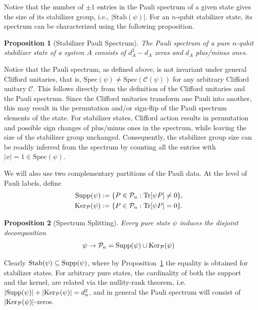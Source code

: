 \documentclass[aps,pra,superscriptaddress,twocolumn,longbibliography]{revtex4-2}
\newcommand{\tr}{{\rm Tr}}
\newtheorem{proposition}{Proposition}
\begin{document}
Notice that the number of $\pm1$ entries in the Pauli spectrum of a given state gives the size of its stabilizer group, i.e., $|\text{Stab}(\psi)|$. For an $n$-qubit stabilizer state, its spectrum can be characterized using the following proposition.
%
\begin{proposition}[Stabilizer Pauli Spectrum]\label{proposition:Stab_Pauli_spectrum}
The Pauli spectrum of a pure $n$-qubit stabilizer state of a system $A$ consists of $d_{A}^{2}-d_{A}$ zeros and $d_{A}$ plus/minus ones.
\end{proposition}
Notice that the Pauli spectrum, as defined above, is not invariant under general Clifford unitaries, that is, $\text{Spec}(\psi) \neq \text{Spec}(\mathcal{C}(\psi))$ for any arbitrary Clifford unitary $\mathcal{C}$.
This follows directly from the definition of the Clifford unitaries and the Pauli spectrum. 
Since the Clifford unitaries transform one Pauli into another, this may result in the permutation and/or sign-flip of the Pauli spectrum elements of the state.
For stabilizer states, Clifford action results in permutation and possible sign changes of plus/minus ones in the spectrum, while leaving the size of the stabilizer group unchanged. 
Consequently, the stabilizer group size can be readily inferred from the spectrum by counting all the entries with $|x|=1 \in \text{Spec}(\psi)$.

We will also use two complementary partitions of the Pauli data. At the level of Pauli labels, define
\begin{align}
    \mathrm{Supp}(\psi)
    &:={\left\{P\in\mathcal{P}_n:\tr[\psi P]\neq0\right\}},\\
    \mathrm{Ker}_{\mathcal P}(\psi)
    &:={\left\{P\in\mathcal{P}_n:\tr[\psi P]=0\right\}}.
\end{align}

%
\begin{proposition}[Spectrum Splitting]
\label{Prop:rank_nullity_construction}
Every pure state $\psi$ induces the disjoint decomposition
%
\begin{equation}
    \psi \to \mathcal{P}_{n} = {\rm Supp}(\psi) \cup {\rm Ker}_{\mathcal{P}}(\psi)
\end{equation}
\end{proposition}

Clearly ${\rm Stab}(\psi) \subseteq {\rm Supp}(\psi)$, where by Proposition~\ref{proposition:Stab_Pauli_spectrum} the equality is obtained for stabilizer states. For arbitrary pure states, the cardinality of both the support and the kernel, are related via the nullity-rank theorem, ${\rm i.e.}$ $|{\rm Supp}(\psi)|+|{\rm Ker}_{\mathcal{P}}(\psi)|=d_{n}^{2}$, and in general the Pauli spectrum will consist of $|{\rm Ker}_{\mathcal{P}}(\psi)|$-zeros.
\end{document}
